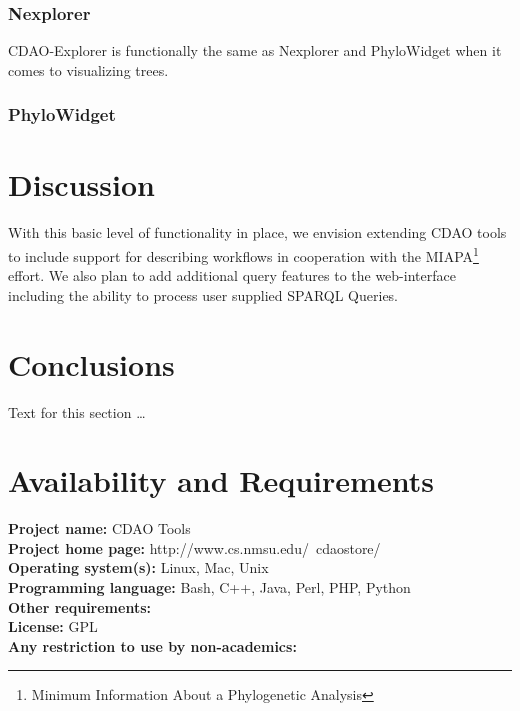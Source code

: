 \documentclass[10pt]{bmc_article}
\newenvironment{bmcformat}{\begin{raggedright}\baselineskip20pt\sloppy\setboolean{publ}{false}}{\end{raggedright}\baselineskip20pt\sloppy}
\begin{document}
\begin{bmcformat}
\subsubsection*{Nexplorer}
CDAO-Explorer is functionally the same as Nexplorer and PhyloWidget when it comes to visualizing trees.
\subsubsection*{PhyloWidget}


\section*{Discussion}

  With this basic level of functionality in place, we envision extending CDAO tools to include support for describing
  workflows in cooperation with the MIAPA\footnote{Minimum Information About a Phylogenetic Analysis} effort.
  We also plan to add additional query features to the web-interface including the ability to process user supplied
  SPARQL Queries.
  

\section*{Conclusions}
  Text for this section \ldots

	
  
\section*{Availability and Requirements}
  \textbf{Project name:} CDAO Tools\\
  \textbf{Project home page:} http://www.cs.nmsu.edu/~cdaostore/ \\ 
  \textbf{Operating system(s):} Linux, Mac, Unix \\
  \textbf{Programming language:} Bash, C++, Java, Perl, PHP, Python \\ 
  \textbf{Other requirements:} \\ 
  \textbf{License:} GPL \\ 
  \textbf{Any restriction to use by non-academics:} \\ 


\end{bmcformat}
\end{document}
